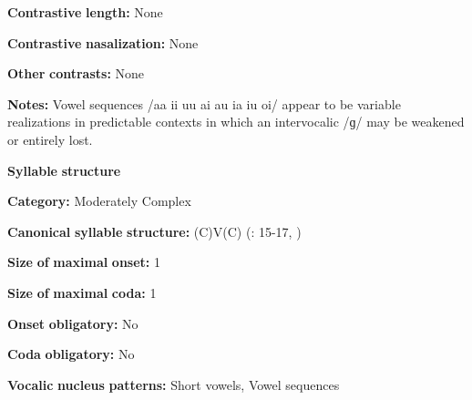 \documentclass[output=paper]{langsci/langscibook}
\begin{document}
\begin{styleBody}
\textbf{Contrastive} \textbf{length:} None
\end{styleBody}

\begin{styleBody}
\textbf{Contrastive} \textbf{nasalization:} None
\end{styleBody}

\begin{styleBody}
\textbf{Other} \textbf{contrasts:} None
\end{styleBody}

\begin{styleBody}
\textbf{Notes:} Vowel sequences /aa ii uu ai au ia iu oi/ appear to be variable realizations in predictable contexts in which an intervocalic /ɡ/ may be weakened or entirely lost.
\end{styleBody}

\begin{styleBody}
\textbf{Syllable} \textbf{structure}
\end{styleBody}

\begin{styleBody}
\textbf{Category:} Moderately Complex
\end{styleBody}

\begin{styleBody}
\textbf{Canonical} \textbf{syllable} \textbf{structure:} (C)V(C) (\citealt{Hutchison1981}: 15-17, \citealt{Cyffer1998})
\end{styleBody}

\begin{styleBody}
\textbf{Size} \textbf{of} \textbf{maximal} \textbf{onset:} 1
\end{styleBody}

\begin{styleBody}
\textbf{Size} \textbf{of} \textbf{maximal} \textbf{coda:} 1
\end{styleBody}

\begin{styleBody}
\textbf{Onset} \textbf{obligatory:} No
\end{styleBody}

\begin{styleBody}
\textbf{Coda} \textbf{obligatory:} No
\end{styleBody}

\begin{styleBody}
\textbf{Vocalic} \textbf{nucleus} \textbf{patterns:} Short vowels, Vowel sequences
\end{styleBody}
\end{document}
